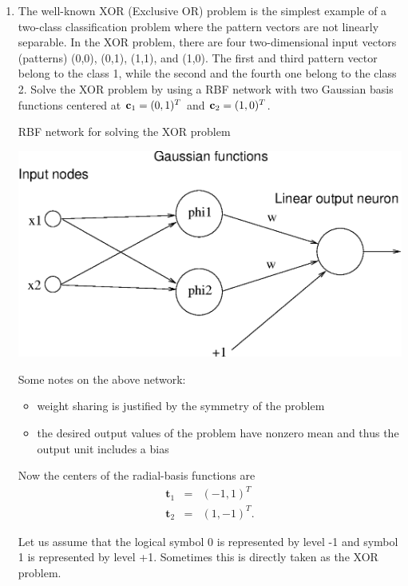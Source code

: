 \begin{enumerate}
\item The well-known XOR (Exclusive OR) problem is the simplest example of a
  two-class classification problem where the pattern vectors are not linearly
  separable. In the XOR problem, there are four two-dimensional input vectors
  (patterns) (0,0), (0,1), (1,1), and (1,0). The first and third pattern
  vector belong to the class 1, while the second and the fourth one belong
  to the class 2. Solve the XOR problem by using a RBF network with two
  Gaussian basis functions centered at ${\bf c}_1 = (0,1)^T$ and
  ${\bf c}_2 = (1,0)^T$.

  \begin{solution}

    RBF network for solving the XOR problem

    \begin{center}
      \includegraphics[scale=0.7]{v102-f1.eps}
    \end{center}

    Some notes on the above network:
    \begin{itemize}
    \item weight sharing is justified by the symmetry of the problem
    \item the desired output values of the problem have nonzero mean and
      thus the output unit includes a bias 
    \end{itemize}
    Now the centers of the radial-basis functions are
    \begin{eqnarray*}
      \mathbf{t}_1&=&(-1,1)^T\\
      \mathbf{t}_2&=&(1,-1)^T.
    \end{eqnarray*}

    Let us assume that the logical symbol 0 is represented by level -1
    and symbol 1 is represented by level +1. Sometimes this is directly
    taken as the XOR problem.


\end{solution}
\end{enumerate}
